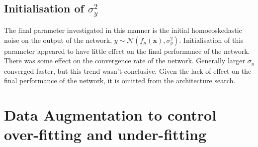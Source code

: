 \subsection{Initialisation of \( \sigma_y^2 \)}

The final parameter investigated in this manner is the initial homoeoskedastic noise on the output of the network, \( y \sim \mathcal{N}(f_\mu(\mathbf{x}), \sigma_y^2) \). Initialisation of this parameter appeared to have little effect on the final performance of the network. There was some effect on the convergence rate of the network. Generally larger \( \sigma_y \) converged faster, but this trend wasn't conclusive. Given the lack of effect on the final performance of the network, it is omitted from the architecture search.

\section{Data Augmentation to control over-fitting and under-fitting}
\label{sec:dataaug}

